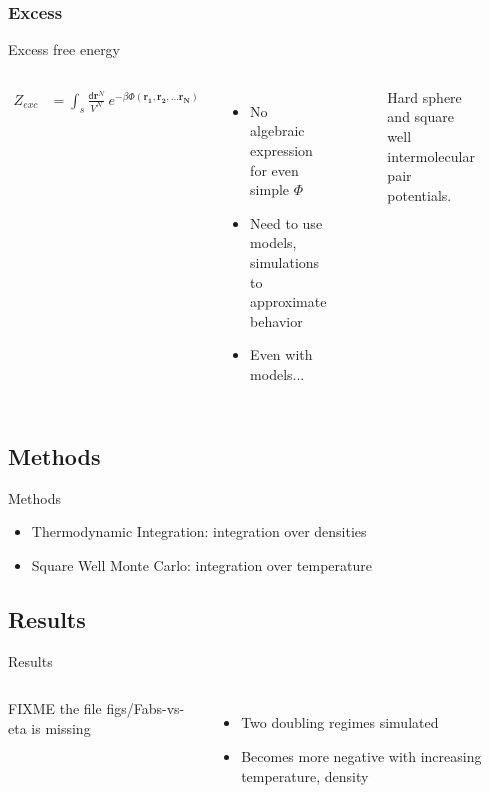 \documentclass{beamer}
\newcommand*{\diff}{\mathsf{d}}
\begin{document}
\subsubsection*{Excess}
\begin{frame}{Excess free energy}	
	\begin{columns}[t]
	\setlength\abovedisplayskip{-2pt} 
	\begin{align*}
		Z_{exc} &= \int_s \frac{\diff\mathbf{r}^N}{V^N} ~e^{-\beta \Phi(\mathbf{r_1}, \mathbf{r_2}, \dots \mathbf{r_N})}
	\end{align*}
	\begin{itemize}
		\item No algebraic expression for even simple $\Phi$
		\item Need to use models, simulations to approximate behavior
		\item Even with models...
	\end{itemize}
	\begin{figure}
		\caption{Hard sphere and square well intermolecular pair potentials.}
	\end{figure}
	\end{columns}
\end{frame}


\subsection*{Methods}
\begin{frame}{Methods}
	\begin{itemize}
		\item Thermodynamic Integration: integration over densities
		\item Square Well Monte Carlo: integration over temperature
	\end{itemize}
\end{frame}

\subsection*{Results}
\begin{frame}{Results}
\begin{columns}
        FIXME the file figs/Fabs-vs-eta is missing
	\begin{itemize}
		\item Two doubling regimes simulated
		\item Becomes more negative with increasing temperature, density 
	\end{itemize}
\end{columns}
\end{frame}
\end{document}
